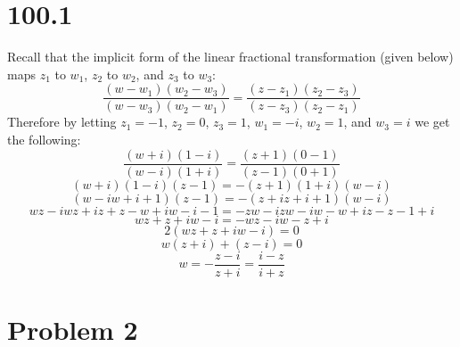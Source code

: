 \documentclass{article}
\begin{document}
\newpage
\section*{100.1}
\begin{center}
    \doublespacing
    Recall that the implicit form of the linear fractional transformation (given below) maps $z_1$ to $w_1$, $z_2$ to $w_2$, and $z_3$ to $w_3$:
    \[\frac{(w - w_1)(w_2 - w_3)}{(w - w_3)(w_2 - w_1)} =\frac{(z - z_1)(z_2 - z_3)}{(z - z_3)(z_2 - z_1)}\]
    Therefore by letting $z_1 = -1$, $z_2 = 0$, $z_3 = 1$, $w_1 = -i$, $w_2 = 1$, and $w_3 = i$ we get the following:
    \[\frac{(w + i)(1 - i)}{(w - i)(1 + i)} =\frac{(z + 1)(0 - 1)}{(z - 1)(0 + 1)}\]
    \[(w + i)(1 - i)(z - 1) = -(z + 1)(1 + i)(w - i)\]
    \[(w - iw + i + 1)(z - 1) = -(z + iz + i + 1)(w - i)\]
    \[wz - iwz + iz + z - w + iw - i - 1 = -zw - izw - iw - w + iz - z - 1 + i\]
    \[wz + z + iw - i = -wz - iw - z + i\]
    \[2(wz + z + iw - i) = 0\]
    \[w(z + i) + (z - i) = 0\]
    \[w =-\frac{z - i}{z + i} =\frac{i - z}{i + z}\]
    \qedsymbol
\end{center}


\newpage
\section*{Problem 2}
\end{document}
